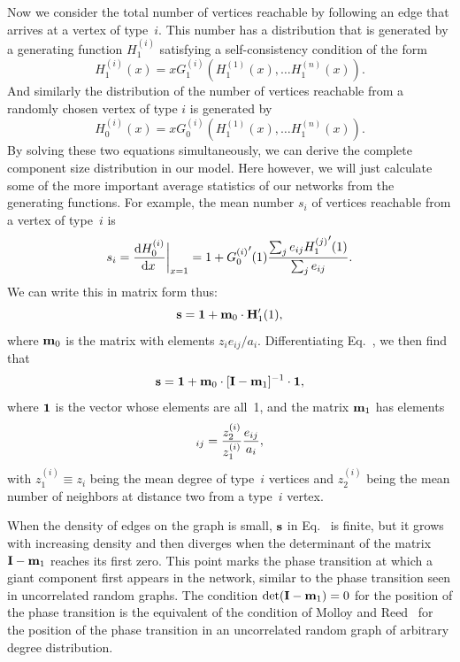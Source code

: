 \documentclass[twocolumn,pre]{revtex4}
\begin{document}
Now we consider the total number of vertices reachable by following an edge
that arrives at a vertex of type~$i$.  This number has a distribution that
is generated by a generating function $H_1^{(i)}$ satisfying a
self-consistency condition of the form
\begin{equation}
H_1^{(i)}(x) = x G_1^{(i)}(H_1^{(1)}(x),\ldots H_1^{(n)}(x)).
\label{defsh1}
\end{equation}
And similarly the distribution of the number of vertices reachable from a
randomly chosen vertex of type $i$ is generated by
\begin{equation}
H_0^{(i)}(x) = x G_0^{(i)}(H_1^{(1)}(x),\ldots H_1^{(n)}(x)).
\end{equation}
By solving these two equations simultaneously, we can derive the complete
component size distribution in our model.  Here however, we will just
calculate some of the more important average statistics of our networks
from the generating functions.  For example, the mean number $s_i$ of
vertices reachable from a vertex of type~$i$ is
\begin{equation}
s_i = {{\rm d} H_0^{(i)}\over\!{\rm d} x}\biggr|_{x=1}
    = 1 + {G_0^{(i)}}'(1) {\sum_j e_{ij} {H_1^{(j)}}'(1)\over\sum_j e_{ij}}.
\end{equation}
We can write this in matrix form thus:
\begin{equation}
\mathbf{s} = \mathbf{1} + \mathbf{m}_0\cdot\mathbf{H}_1'(1),
\end{equation}
where $\mathbf{m}_0$ is the matrix with elements $z_i {e_{ij}/a_i}$.
Differentiating Eq.~, we then find that
\begin{equation}
\mathbf{s} = \mathbf{1} + \mathbf{m}_0\cdot[\mathbf{I}-\mathbf{m}_1]^{-1}\cdot\mathbf{1},
\label{vsi}
\end{equation}
where $\mathbf{1}$ is the vector whose elements are all~1, and the matrix
$\mathbf{m}_1$ has elements
\begin{equation}
[\vm_1]_{ij} = {z_2^{(i)}\over z_1^{(i)}} {e_{ij}\over a_i},
\end{equation}
with $z_1^{(i)}\equiv z_i$ being the mean degree of type~$i$ vertices and
$z_2^{(i)}$ being the mean number of neighbors at distance two from a
type~$i$ vertex.

When the density of edges on the graph is small, $\mathbf{s}$ in Eq.~ is
finite, but it grows with increasing density and then diverges when the
determinant of the matrix $\mathbf{I}-\mathbf{m}_1$ reaches its first zero.  This point
marks the phase transition at which a giant component first appears in the
network, similar to the phase transition seen in uncorrelated random
graphs.  The condition $\det(\mathbf{I}-\mathbf{m}_1)=0$ for the position of the phase
transition is the equivalent of the condition of Molloy and
Reed~\cite{MR95} for the position of the phase transition in an
uncorrelated random graph of arbitrary degree distribution.
\end{document}
